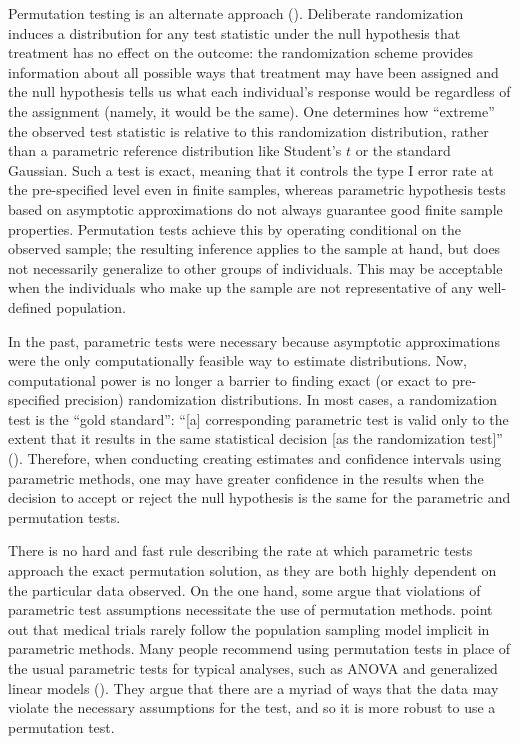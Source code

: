 \documentclass[11pt]{article}
\begin{document}
Permutation testing is an alternate approach (\cite{fisher_design_1935, pitman_significance_1937,pitman_significance_1938}).
Deliberate randomization induces a distribution for any test statistic under the null hypothesis that treatment has no effect on the outcome:
the randomization scheme provides information about all possible ways that treatment may have been assigned 
and the null hypothesis tells us what each individual's response would be regardless of the assignment (namely, it would be the same).
One determines how ``extreme'' the observed test statistic is relative to this randomization distribution, rather than a parametric reference distribution like Student's $t$ or the standard Gaussian.
Such a test is exact, meaning that it controls the type I error rate at the pre-specified level even in finite samples, whereas parametric hypothesis tests based on asymptotic approximations do not always guarantee good finite sample properties.
Permutation tests achieve this by operating conditional on the observed sample; the resulting inference applies to the sample at hand, but does not necessarily generalize to other groups of individuals.
This may be acceptable when the individuals who make up the sample are not representative of any well-defined population.

In the past, parametric tests were necessary because asymptotic approximations were the only computationally feasible way to estimate distributions. 
Now, computational power is no longer a barrier to finding exact (or exact to pre-specified precision) randomization distributions.
In most cases, a randomization test is the ``gold standard'':
``[a] corresponding parametric test is valid only to the extent that it results in the same statistical decision [as the randomization test]'' (\cite{bradley_distribution_1968}).
Therefore, when conducting creating estimates and confidence intervals using parametric methods, one may have greater confidence in the results when the decision to accept or reject the null hypothesis is the same for the parametric and permutation tests.

There is no hard and fast rule describing the rate at which parametric tests approach the exact permutation solution, as they are both highly dependent on the particular data observed.
On the one hand, some argue that violations of parametric test assumptions necessitate the use of permutation methods.
\cite{ludbrook_why_1998} point out that medical trials rarely follow the population sampling model implicit in parametric methods.
Many people recommend using permutation tests in place of the usual parametric tests for typical analyses, such as ANOVA and generalized linear models (\cite{still_approximate_1981, winkler_permutation_2014}).
They argue that there are a myriad of ways that the data may violate the necessary assumptions for the test, and so it is more robust to use a permutation test.
\end{document}
